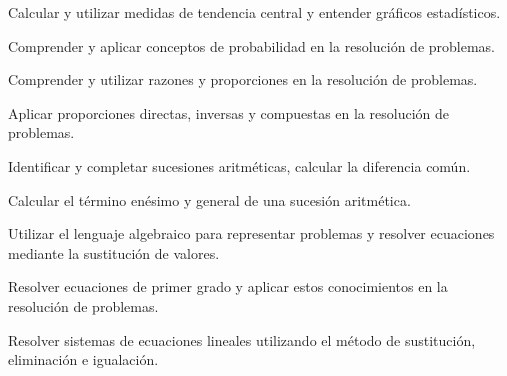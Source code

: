 \item Calcular y utilizar medidas de tendencia central y entender gráficos estadísticos.
\item Comprender y aplicar conceptos de probabilidad en la resolución de problemas.
\item Comprender y utilizar razones y proporciones en la resolución de problemas.
\item Aplicar proporciones directas, inversas y compuestas en la resolución de problemas.
\item Identificar y completar sucesiones aritméticas, calcular la diferencia común.
\item Calcular el término enésimo y general de una sucesión aritmética.
\item Utilizar el lenguaje algebraico para representar problemas y resolver ecuaciones mediante la sustitución de valores.
\item Resolver ecuaciones de primer grado y aplicar estos conocimientos en la resolución de problemas.
\item Resolver sistemas de ecuaciones lineales utilizando el método de sustitución, eliminación e igualación.